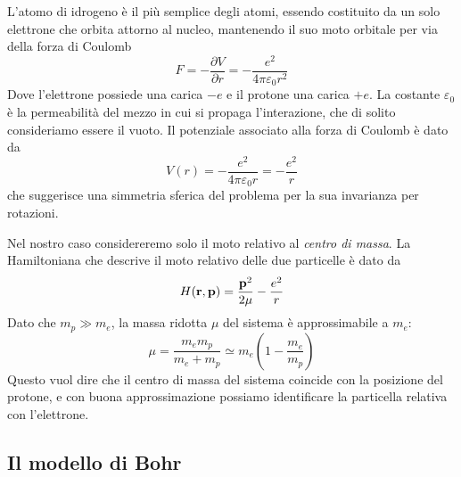 L'atomo di idrogeno \`e il pi\`u semplice degli atomi, essendo costituito da un solo elettrone che orbita attorno al nucleo, mantenendo il suo moto orbitale per via della forza di Coulomb
\begin{equation*}
	F = - \frac{\partial V}{\partial r} = - \frac{e^2}{4\pi \varepsilon_0 r^2}
\end{equation*}
Dove l'elettrone possiede una carica $-e$ e il protone una carica $+e$. La costante $\varepsilon_0$ \`e la permeabilit\`a del mezzo in cui si propaga l'interazione, che di solito consideriamo essere il vuoto. Il potenziale associato alla forza di Coulomb \`e dato da 
\begin{equation*}
	V(r) = - \frac{e^2}{4 \pi \varepsilon_0 r} = - \frac{e^2}{r}
\end{equation*}
che suggerisce una simmetria sferica del problema per la sua invarianza per rotazioni.

Nel nostro caso considereremo solo il moto relativo al \textit{centro di massa}. La Hamiltoniana che descrive il moto relativo delle due  particelle \`e dato da
\begin{equation*}
	H(\bold{r},\bold{p}) = \frac{\bold{p}^2}{2\mu} - \frac{e^2}{r}
\end{equation*} 
Dato che $m_p \gg m_e$, la massa ridotta $\mu$ del sistema \`e approssimabile a $m_e$:
\begin{equation*}
	\mu = \frac{m_em_p}{m_e+m_p} \simeq m_e \left( 1 - \frac{m_e}{m_p}\right)
\end{equation*}
Questo vuol dire che il centro di massa del sistema coincide con la posizione del protone, e con buona approssimazione possiamo identificare la particella relativa con l'elettrone.

\subsection{Il modello di Bohr }

